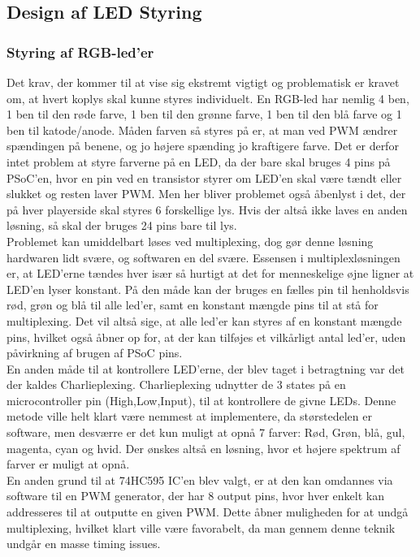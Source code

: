 \documentclass[HardwareDesign/HardwareDesign_main.tex]{subfiles}
\begin{document}
\subsection{Design af LED Styring}
\subsubsection{Styring af RGB-led'er}
Det krav, der kommer til at vise sig ekstremt vigtigt og problematisk er kravet om, at hvert koplys skal kunne styres individuelt. En RGB-led har nemlig 4 ben, 1 ben til den røde farve, 1 ben til den grønne farve, 1 ben til den blå farve og 1 ben til katode/anode. Måden farven så styres på er, at man ved PWM ændrer spændingen på benene, og jo højere spænding jo kraftigere farve. Det er derfor intet problem at styre farverne på en LED, da der bare skal bruges 4 pins på PSoC'en, hvor en pin ved en transistor styrer om LED'en skal være tændt eller slukket og resten laver PWM. Men her bliver problemet også åbenlyst i det, der på hver playerside skal styres 6 forskellige lys. Hvis der altså ikke laves en anden løsning, så skal der bruges 24 pins bare til lys. 
\\Problemet kan umiddelbart løses ved multiplexing, dog gør denne løsning hardwaren lidt svære, og softwaren en del svære. Essensen i multiplexløsningen er, at LED'erne tændes hver især så hurtigt at det for menneskelige øjne ligner at LED'en lyser konstant. På den måde kan der bruges en fælles pin til henholdsvis rød, grøn og blå til alle led'er, samt en konstant mængde pins til at stå for multiplexing. Det vil altså sige, at alle led'er kan styres af en konstant mængde pins, hvilket også åbner op for, at der kan tilføjes et vilkårligt antal led'er, uden påvirkning af brugen af PSoC pins.
\\En anden måde til at kontrollere LED'erne, der blev taget i betragtning var det der kaldes Charlieplexing. Charlieplexing udnytter de 3 states på en microcontroller pin (High,Low,Input), til at kontrollere de givne LEDs. Denne metode ville helt klart være nemmest at implementere, da størstedelen er software, men desværre er det kun muligt at opnå 7 farver: Rød, Grøn, blå, gul, magenta, cyan og hvid. Der ønskes altså en løsning, hvor et højere spektrum af farver er muligt at opnå.
\\En anden grund til at 74HC595 IC'en blev valgt, er at den kan omdannes via software til en PWM generator, der har 8 output pins, hvor hver enkelt kan addresseres til at outputte en given PWM. Dette åbner muligheden for at undgå multiplexing, hvilket klart ville være favorabelt, da man gennem denne teknik undgår en masse timing issues.
\end{document}

